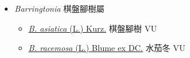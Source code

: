
  \begin{itemize}
 \item[] \textit{Barringtonia} 棋盤腳樹屬
                    
  \begin{itemize}
        \item[] \href{http://www.theplantlist.org/tpl1.1/search?q=Barringtonia+asiatica}{\textit{B. asiatica} (L.) Kurz.}   棋盤腳樹 VU
        \item[] \href{http://www.theplantlist.org/tpl1.1/search?q=Barringtonia+racemosa}{\textit{B. racemosa} (L.) Blume ex DC.}   水茄冬 VU
  \end{itemize}
  \end{itemize}
